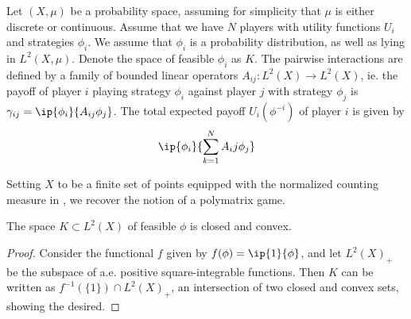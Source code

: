 \begin{definition} \label{def:lin_game}
  Let $(X,\mu)$ be a probability space, assuming for simplicity that $\mu$ is either discrete or  continuous. Assume that we have $N$ players with utility functions $U_i$ and strategies $\phi_i$. We assume that $\phi_i$ is a probability distribution, as well as lying in $L^2(X,\mu)$. Denote the space of feasible $\phi_i$ as $K$. The pairwise interactions are defined by a family of bounded linear operators $A_{ij}: L^2(X)\to L^2(X)$, ie. the payoff of player $i$ playing strategy $\phi_i$ against player $j$ with strategy $\phi_j$ is $\gamma_{ij}=\ip{\phi_i}{A_{ij} \phi_j}$. The total expected payoff $U_i(\phi^{-i})$ of player $i$ is given by
  \begin{equation}
    \ip{\phi_i}{\sum_{k=1}^N A_ij \phi_j}
  \end{equation}
\end{definition}
\begin{remark}
  Setting $X$ to be a finite set of points equipped with the normalized counting measure in , we recover the notion of a polymatrix game.
\end{remark}
\begin{lemma}
  The space $K\subset L^2(X)$ of feasible $\phi$ is closed and convex.
\end{lemma}
\begin{proof}
  Consider the functional $f$ given by $f(\phi)=\ip{1}{\phi}$, and let $L^2(X)_+$ be the subspace of a.e. positive square-integrable functions. Then $K$ can be written as $f^{-1}(\{1\}) \cap L^2(X)_+$, an intersection of two closed and convex sets, showing the desired.
\end{proof}

